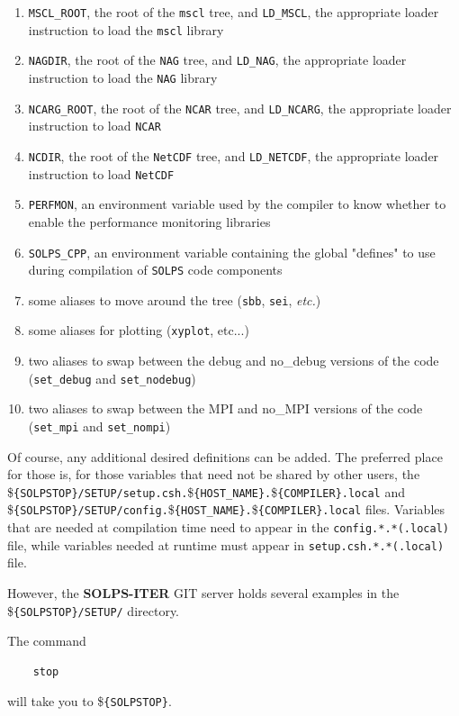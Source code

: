 \documentclass[a4paper,10pt]{report}
\newcommand\SOLPSITER{{\bf SOLPS-ITER} }
\begin{document}
\begin{enumerate}
\item {\tt MSCL\_ROOT}, the root of the {\tt mscl} tree, and
  {\tt LD\_MSCL}, the appropriate loader instruction to load the {\tt mscl} library
\item {\tt NAGDIR}, the root of the {\tt NAG} tree, and
  {\tt LD\_NAG}, the appropriate loader instruction to load the {\tt NAG} library
\item {\tt NCARG\_ROOT}, the root of the {\tt NCAR} tree, and
  {\tt LD\_NCARG}, the appropriate loader instruction to load {\tt NCAR}
\item {\tt NCDIR}, the root of the {\tt NetCDF} tree, and
  {\tt LD\_NETCDF}, the appropriate loader instruction to load {\tt NetCDF}
\item {\tt PERFMON}, an environment variable used by
  the compiler to know whether to enable the performance monitoring libraries
\item {\tt SOLPS\_CPP}, an environment variable containing the global "defines"
  to use during compilation of {\tt SOLPS} code components
\item some aliases to move around the tree ({\tt sbb}, {\tt sei},
  {\it etc.})
\item some aliases for plotting ({\tt xyplot}, etc...)
\item two aliases to swap between the debug and no\_debug versions of
  the code ({\tt set\_debug} and {\tt set\_nodebug})
\item two aliases to swap between the MPI and no\_MPI versions of
  the code ({\tt set\_mpi} and {\tt set\_nompi})
\end{enumerate}
Of course, any additional desired definitions can be added. The preferred place for those is, for those variables that need not be shared by other users, the \${\tt \{SOLPSTOP\}/SETUP/setup.csh.}\${\tt \{HOST\_NAME\}.}\${\tt \{COMPILER\}.local} and \${\tt \{SOLPSTOP\}/SETUP/config.}\${\tt \{HOST\_NAME\}.}\${\tt \{COMPILER\}.local} files. Variables that are needed at compilation time need to appear in the {\tt config.*.*(.local)} file, while variables needed at runtime must appear in {\tt setup.csh.*.*(.local)} file.

However, the \SOLPSITER GIT server
holds several examples in the \${\tt \{SOLPSTOP\}/SETUP/} directory.

The command
\begin{verbatim}
    stop
\end{verbatim}
will take you to \${\tt \{SOLPSTOP\}}.
\end{document}
